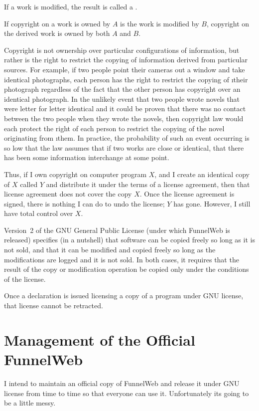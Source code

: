 If a work is modified, the result is called a .

If copyright on a work is owned by $A$ is the work is modified by $B$,
copyright on the derived work is owned by both $A$ and $B$.

Copyright is not ownership over particular configurations of information,
but rather is the right to restrict the copying of information derived
from particular sources. For example, if two people point their cameras
out a window and take identical photographs, each person has the right
to restrict the copying of \i{their} photograph regardless of the
fact that the other person has copyright over an identical photograph.
In the unlikely event that two people wrote
novels that were letter for letter identical and it could be proven that
there was no contact between the two people when they wrote the novels,
then copyright law would each protect the right of each person to
restrict the copying of the novel originating from \i{them}. In practice,
the probability of such an event occurring is so low that the law
assumes that if two works are close or identical, that there has been
some information interchange at some point.

Thus, if I own copyright on computer program $X$, and I create
an identical copy of $X$
called $Y$ and distribute it under the terms of a license agreement,
then that license agreement does not cover the copy $X$. Once the
license agreement is signed, there is nothing I can do to undo the
license; $Y$ has gone. However, I still have total control over $X$.

Version~2 of the GNU General Public License
(under which FunnelWeb is
released) specifies (in a nutshell) that software can be copied freely
so long as it is not sold, and that it can be modified and copied
freely so long as the modifications are logged and it is not sold.
In both cases, it requires that the
result of the copy or modification operation
be copied only under the conditions of the license.

Once a declaration is issued licensing a copy of a program under GNU
license, that license cannot be retracted.

\section{Management of the Official FunnelWeb}

I intend to maintain an official copy of FunnelWeb and release it under
GNU license from time to time so that everyone can use it. Unfortunately
its going to be a little messy.

